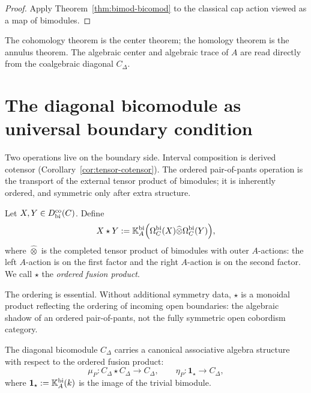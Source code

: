 \begin{proof}
Apply Theorem~\ref{thm:bimod-bicomod} to the classical cap action viewed as a map of bimodules.
\end{proof}

\begin{remark}
The cohomology theorem is the center theorem; the homology theorem
is the annulus theorem. The algebraic center and algebraic trace of
$A$ are read directly from the coalgebraic diagonal $C_\Delta$.
\end{remark}

\section{The diagonal bicomodule as universal boundary condition}
\label{sec:open-trace}

Two operations live on the boundary side. Interval composition is
derived cotensor (Corollary~\ref{cor:tensor-cotensor}). The ordered
pair-of-pants operation is the transport of the external tensor
product of bimodules; it is inherently ordered, and symmetric only
after extra structure.

\begin{definition}
Let $X,Y\in D^{\mathrm{co}}_{\mathrm{bi}}(C)$. Define
\[
X\star Y
:=
\mathbb{K}_A^{\mathrm{bi}}\Bigl(
\Omega_C^{\mathrm{bi}}(X)\widehat\otimes \Omega_C^{\mathrm{bi}}(Y)
\Bigr),
\]
where $\widehat\otimes$ is the completed tensor product of bimodules with outer $A$-actions:
the left $A$-action is on the first factor and the right $A$-action is on the second factor.
We call $\star$ the \emph{ordered fusion product}.
\end{definition}

\begin{remark}
The ordering is essential. Without additional symmetry data, $\star$
is a monoidal product reflecting the ordering of incoming open
boundaries: the algebraic shadow of an ordered pair-of-pants, not
the fully symmetric open cobordism category.
\end{remark}

\begin{theorem}
\label{thm:pair-of-pants}
The diagonal bicomodule $C_\Delta$ carries a canonical associative algebra structure with respect to
the ordered fusion product:
\[
\mu_P:C_\Delta\star C_\Delta\longrightarrow C_\Delta,
\qquad
\eta_P:\mathbf 1_\star\longrightarrow C_\Delta,
\]
where $\mathbf 1_\star:=\mathbb{K}_A^{\mathrm{bi}}(k)$ is the image of the trivial bimodule.
\end{theorem}

